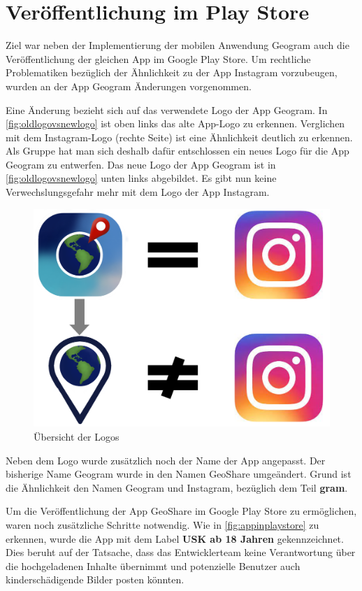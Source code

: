 \chapter{Veröffentlichung im Play Store\label{chap5:Fuenftes-Kapitel}}

Ziel war neben der Implementierung der mobilen Anwendung \glqq Geogram\grqq{} auch die Veröffentlichung der gleichen App im Google Play Store. Um rechtliche Problematiken bezüglich der Ähnlichkeit zu der App \glqq Instagram\grqq{} vorzubeugen, wurden an der App \glqq Geogram\grqq{} Änderungen vorgenommen.

Eine Änderung bezieht sich auf das verwendete Logo der App \glqq Geogram\grqq{}. In \autoref{fig:oldlogovsnewlogo} ist oben links das alte App-Logo zu erkennen. Verglichen mit dem Instagram-Logo (rechte Seite) ist eine Ähnlichkeit deutlich zu erkennen. Als Gruppe hat man sich deshalb dafür entschlossen ein neues Logo für die App \glqq Geogram\grqq{} zu entwerfen. Das neue Logo der App \glqq Geogram\grqq{} ist in \autoref{fig:oldlogovsnewlogo} unten links abgebildet. Es gibt nun keine Verwechslungsgefahr mehr mit dem Logo der App \glqq Instagram\grqq{}.

\begin{figure}[H]
    \centering
    \includegraphics[width=0.8\linewidth]{images/logovsinsta.png}
    \caption{Übersicht der Logos}
    \label{fig:oldlogovsnewlogo}
\end{figure}

Neben dem Logo wurde zusätzlich noch der Name der App angepasst. Der bisherige Name \glqq Geogram\grqq{} wurde in den Namen \glqq GeoShare\grqq{} umgeändert. Grund ist die Ähnlichkeit den Namen \glqq Geogram\grqq{} und \glqq Instagram\grqq{}, bezüglich dem Teil \glqq \textbf{gram}\grqq{}.

Um die Veröffentlichung der App \glqq GeoShare\grqq{} im Google Play Store zu ermöglichen, waren noch zusätzliche Schritte notwendig. Wie in \autoref{fig:appinplaystore} zu erkennen, wurde die App mit dem Label \glqq \textbf{USK ab 18 Jahren}\grqq{} gekennzeichnet. Dies beruht auf der Tatsache, dass das Entwicklerteam keine Verantwortung über die hochgeladenen Inhalte übernimmt und potenzielle Benutzer auch kinderschädigende Bilder posten könnten.

